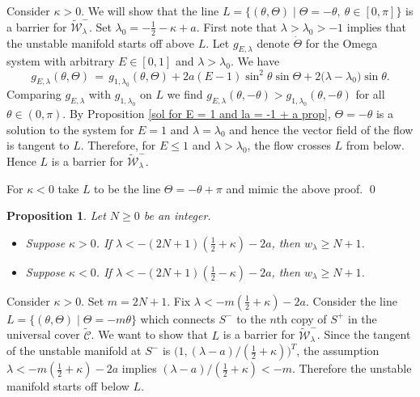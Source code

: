 \documentclass[11 pt]{article}
\newtheorem{prop}[thm]{Proposition}%
\renewcommand\l{\lambda}
\renewcommand\({\left(}
\renewcommand\){\right)}
\newcommand\wt{\widetilde}
\newcommand\<{\langle}
\renewcommand\>{\rangle}
\renewcommand\l{\lambda}
\newcommand\8{\infty}
\newcommand{\mc}{\mathcal}
\begin{document}
\proof
Consider $\kappa > 0$. We will show that the line $L = \{(\theta, \Theta) \mid \Theta = -\theta,\: \theta \in [0,\pi]\}$ is a barrier for $\wt{\mc{W}}^-_\l$. Set $\l_0 = - \frac{1}{2} - \kappa + a$. First note that $\l > \l_0 > -1$ implies that the unstable manifold starts off above $L$. Let $g_{E,\l}$ denote $\dot{\Theta}$ for the Omega system with arbitrary $E \in [0,1]$ and $\l > \l_0$.  We have
\[
g_{E,\l}(\theta, \Theta) \,=\, g_{1, \l_0}(\theta, \Theta) + 2a(E - 1)\sin^2\theta \sin\Theta + 2\big(\l-\l_0\big)\sin\theta.
\]
Comparing $g_{E,\l}$ with $g_{1, \l_0}$ on $L$ we find $g_{E, \l}(\theta, -\theta) > g_{1,\l_0}(\theta, -\theta)$  for all $\theta \in (0,\pi)$. By Proposition \ref{sol for E = 1 and la = -1 + a prop}, $\Theta = - \theta$ is a solution to the system for $E = 1$ and $\l = \l_0$ and hence the vector field of the flow is tangent to $L$. Therefore, for $E \leq 1$ and $\l > \l_0$, the flow crosses $L$ from below. Hence $L$ is a barrier for $\wt{\mc{W}}^-_\l$. 

For $\kappa < 0$ take $L$ to be the line $\Theta = - \theta + \pi$ and mimic the above proof. 
\qed


\medskip
\medskip

\begin{prop}\label{pos wind num theta prop 2}
Let $N \geq 0$ be an integer.
\begin{itemize}
\item[$\bullet$] Suppose $\kappa > 0$. If $\lambda < -(2N +1)(\frac{1}{2} + \kappa) - 2a$, then $w_\lambda \geq N + 1$.

\item[$\bullet$] Suppose $\kappa < 0$. If $\lambda < -(2N +1)(\frac{1}{2} - \kappa) - 2a$, then $w_\lambda \geq N + 1$.
\end{itemize}
\end{prop}

\proof
Consider $\kappa > 0$. Set $m = 2N + 1$. Fix $\l < -m(\frac{1}{2} + \kappa) - 2a$.  Consider the line $L = \{ (\theta, \Theta) \mid \Theta = -m\theta\}$ which connects $S^-$ to the $n\text{th}$ copy of $S^+$ in the universal cover $\wt{\mc{C}}$. We want to show that $L$ is a barrier for $\wt{\mc{W}}^-_\lambda$. Since the tangent of the unstable manifold at $S^-$ is $\big(1, (\l -a)/(\frac{1}{2} + \kappa)\big)^T$, the assumption $\l < -m(\frac{1}{2} + \kappa) - 2a$ implies $(\l -a)/(\frac{1}{2} + \kappa) < -m$. Therefore the unstable manifold starts off below $L$. 
\end{document}
